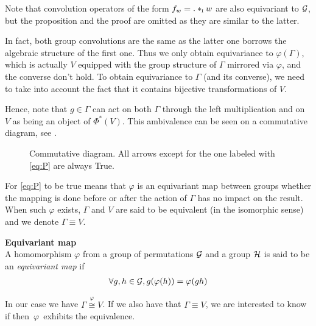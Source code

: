 \begin{remark}Note that convolution operators of the form $f_w = . \ast_{\operatorname{\textsc{i}}} w$ are also equivariant to $\mathcal{G}$, but the proposition and the proof are omitted as they are similar to the latter.
\end{remark}

In fact, both group convolutions are the same as the latter one borrows the algebraic structure of the first one. Thus we only obtain equivariance to $\varphi(\Gamma)$, which is actually $V$ equipped with the group structure of $\Gamma$ mirrored via $\varphi$, and the converse don't hold. To obtain equivariance to $\Gamma$ (and its converse), we need to take into account the fact that it contains bijective transformations of $V$.

Hence, note that $g \in \Gamma$ can act on both $\Gamma$ through the left multiplication and on $V$ as being an object of $\Phi^{*}(V)$. This ambivalence can be seen on a commutative diagram, see .%

\begin{figure}[H]
\centering
{}
\caption{Commutative diagram. All arrows except for the one labeled with \eqref{eq:P} are always True.}
\label{fig:com}
\end{figure}

For \eqref{eq:P} to be true means that $\varphi$ is an equivariant map between groups \ie whether the mapping is done before or after the action of $\Gamma$ has no impact on the result. When such $\varphi$ exists, $\Gamma$ and $V$ are said to be equivalent (in the isomorphic sense) and we denote $\Gamma \equiv V$.

\begin{definition}\textbf{Equivariant map}\\
A homomorphism $\varphi$ from a group of permutations $\mathcal{G}$ and a group $\mathcal{H}$ is said to be an \emph{equivariant map} if
\begin{gather*}
\forall g, h \in \mathcal{G}, g(\varphi(h)) = \varphi(gh)
\end{gather*}
\end{definition}

In our case we have $\Gamma \overset{\varphi}{\cong} V$. If we also have that $\Gamma \equiv V$, we are interested to know if then~$\varphi$~exhibits the equivalence.

